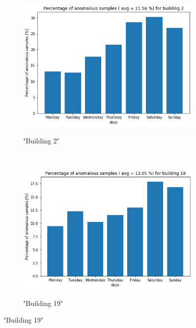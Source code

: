 \begin{figure}[H]
	\begin{subfigure}{.5\textwidth}
		\caption{"Building 2"}
		\includegraphics[width=1\linewidth]{../Figures/EC/b2week.png}
		\label{fig:ec_b2week}
	\end{subfigure}%
	~ 
	\begin{subfigure}{.5\textwidth}
		\caption{"Building 19"}
		\includegraphics[width=1\linewidth]{../Figures/EC/b19week.png}
		\label{fig:ec_b5week}
	\end{subfigure}%
    \bigskip


\end{figure}
